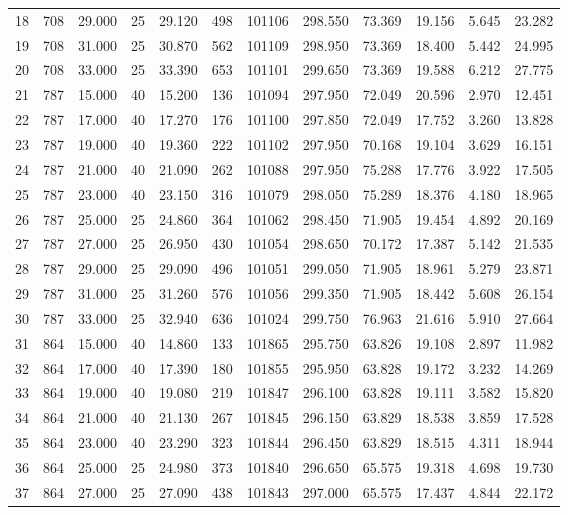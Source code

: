 \begin{table}[H]
\begin{center}
\begin{tabular}{|cccccccccccc|}
	18 & 708 & 29.000 & 25 & 29.120 & 498 & 101106 & 298.550 & 73.369 & 19.156 & 5.645 & 23.282\\
	19 & 708 & 31.000 & 25 & 30.870 & 562 & 101109 & 298.950 & 73.369 & 18.400 & 5.442 & 24.995\\
	20 & 708 & 33.000 & 25 & 33.390 & 653 & 101101 & 299.650 & 73.369 & 19.588 & 6.212 & 27.775\\
	21 & 787 & 15.000 & 40 & 15.200 & 136 & 101094 & 297.950 & 72.049 & 20.596 & 2.970 & 12.451\\
	22 & 787 & 17.000 & 40 & 17.270 & 176 & 101100 & 297.850 & 72.049 & 17.752 & 3.260 & 13.828\\
	23 & 787 & 19.000 & 40 & 19.360 & 222 & 101102 & 297.950 & 70.168 & 19.104 & 3.629 & 16.151\\
	24 & 787 & 21.000 & 40 & 21.090 & 262 & 101088 & 297.950 & 75.288 & 17.776 & 3.922 & 17.505\\
	25 & 787 & 23.000 & 40 & 23.150 & 316 & 101079 & 298.050 & 75.289 & 18.376 & 4.180 & 18.965\\
	26 & 787 & 25.000 & 25 & 24.860 & 364 & 101062 & 298.450 & 71.905 & 19.454 & 4.892 & 20.169\\
	27 & 787 & 27.000 & 25 & 26.950 & 430 & 101054 & 298.650 & 70.172 & 17.387 & 5.142 & 21.535\\
	28 & 787 & 29.000 & 25 & 29.090 & 496 & 101051 & 299.050 & 71.905 & 18.961 & 5.279 & 23.871\\
	29 & 787 & 31.000 & 25 & 31.260 & 576 & 101056 & 299.350 & 71.905 & 18.442 & 5.608 & 26.154\\
	30 & 787 & 33.000 & 25 & 32.940 & 636 & 101024 & 299.750 & 76.963 & 21.616 & 5.910 & 27.664\\
	31 & 864 & 15.000 & 40 & 14.860 & 133 & 101865 & 295.750 & 63.826 & 19.108 & 2.897 & 11.982\\
	32 & 864 & 17.000 & 40 & 17.390 & 180 & 101855 & 295.950 & 63.828 & 19.172 & 3.232 & 14.269\\
	33 & 864 & 19.000 & 40 & 19.080 & 219 & 101847 & 296.100 & 63.828 & 19.111 & 3.582 & 15.820\\
	34 & 864 & 21.000 & 40 & 21.130 & 267 & 101845 & 296.150 & 63.829 & 18.538 & 3.859 & 17.528\\
	35 & 864 & 23.000 & 40 & 23.290 & 323 & 101844 & 296.450 & 63.829 & 18.515 & 4.311 & 18.944\\
	36 & 864 & 25.000 & 25 & 24.980 & 373 & 101840 & 296.650 & 65.575 & 19.318 & 4.698 & 19.730\\
	37 & 864 & 27.000 & 25 & 27.090 & 438 & 101843 & 297.000 & 65.575 & 17.437 & 4.844 & 22.172\\

\end{tabular}
\end{center}
\end{table}
